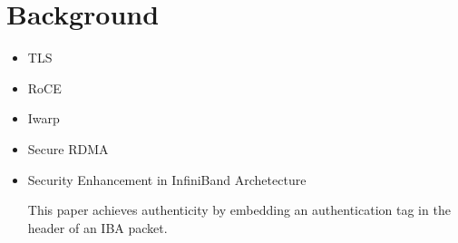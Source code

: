 \section{Background}
\label{sec:background}

\begin{itemize}
    \item{TLS}
    \item{RoCE}
    \item{Iwarp}
    \item{Secure RDMA}
\end{itemize}

\begin{itemize}
\item{Security Enhancement in InfiniBand Archetecture}~\cite{Lee:2005:SEI:1053727.1054449} 

    This paper achieves authenticity by embedding an authentication tag in the
    header of an IBA packet. 

\end{itemize}
